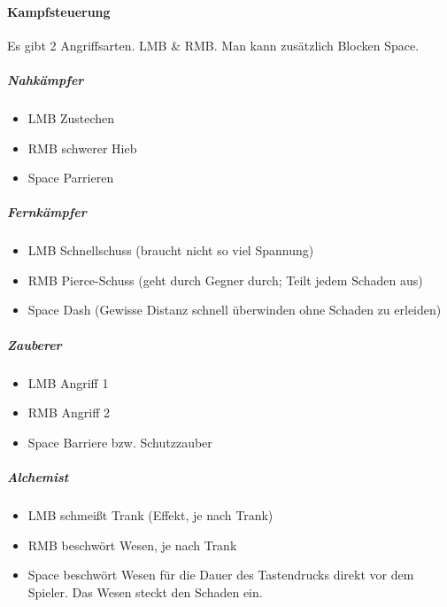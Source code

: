 \paragraph{Kampfsteuerung\\}
Es gibt 2 Angriffsarten. LMB \& RMB. Man kann zusätzlich Blocken Space.
\subparagraph{Nahkämpfer}
\begin{itemize}
\item LMB Zustechen
\item RMB schwerer Hieb
\item Space Parrieren
\end{itemize}

\subparagraph{Fernkämpfer}
\begin{itemize}
\item LMB Schnellschuss (braucht nicht so viel Spannung)
\item RMB Pierce-Schuss (geht durch Gegner durch; Teilt jedem Schaden aus)
\item Space Dash (Gewisse Distanz schnell überwinden ohne Schaden zu erleiden)
\end{itemize}

\subparagraph{Zauberer}
\begin{itemize}
\item LMB Angriff 1
\item RMB Angriff 2
\item Space Barriere bzw. Schutzzauber
\end{itemize}

\subparagraph{Alchemist}
\begin{itemize}
\item LMB schmeißt Trank (Effekt, je nach Trank)
\item RMB beschwört Wesen, je nach Trank
\item Space beschwört Wesen für die Dauer des Tastendrucks direkt vor dem Spieler. Das Wesen steckt den Schaden ein.
\end{itemize}